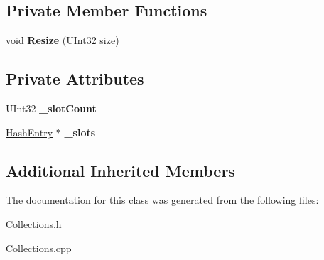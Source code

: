 \subsection*{Private Member Functions}
\begin{DoxyCompactItemize}
\item 
\mbox{\label{class_kernel_dictionary_af09b1d257ebb7fe77858bbc6c1d2bb0f}} 
void {\bfseries Resize} (U\+Int32 size)
\end{DoxyCompactItemize}
\subsection*{Private Attributes}
\begin{DoxyCompactItemize}
\item 
\mbox{\label{class_kernel_dictionary_a22df5c8642a927e967d2b24a6006a133}} 
U\+Int32 {\bfseries \+\_\+slot\+Count}
\item 
\mbox{\label{class_kernel_dictionary_ac6d4eace3f7871ae65bc460c20959265}} 
\hyperlink{class_hash_entry}{Hash\+Entry} $\ast$ {\bfseries \+\_\+slots}
\end{DoxyCompactItemize}
\subsection*{Additional Inherited Members}


The documentation for this class was generated from the following files\+:\begin{DoxyCompactItemize}
\item 
Collections.\+h\item 
Collections.\+cpp\end{DoxyCompactItemize}

